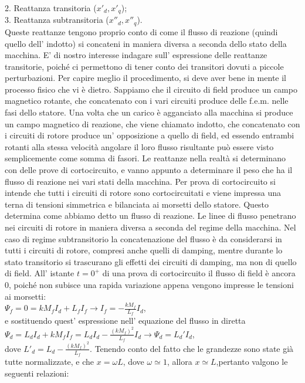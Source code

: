 \documentclass[Lau,noexaminfo]{sapthesis}
\begin{document}
	2. Reattanza transitoria ($x'_d, x'_q$);\\
	3. Reattanza subtransitoria ($x''_d,x''_q$).\\
	Queste reattanze tengono proprio conto di come il flusso di reazione (quindi quello dell' indotto) si concateni in maniera diversa a seconda dello stato della macchina. E' di nostro interesse indagare sull' espressione delle reattanze transitorie, poiché ci permettono di tener conto dei transitori dovuti a piccole perturbazioni.
	Per capire meglio il procedimento, si deve aver bene in mente il processo fisico che vi è dietro. Sappiamo che il circuito di field produce un campo magnetico rotante, che concatenato con i vari circuiti produce delle f.e.m. nelle fasi dello statore. Una volta che un carico è agganciato alla macchina si produce un campo magnetico di reazione, che viene chiamato indotto, che concatenato con i circuiti di rotore produce un' opposizione a quello di field, ed essendo entrambi rotanti alla stessa velocità angolare il loro flusso risultante può essere visto semplicemente come somma di fasori. Le reattanze nella realtà si determinano con delle prove di cortocircuito, e vanno appunto a determinare il peso che ha il flusso di reazione nei vari stati della macchina. Per prova di cortocircuito si intende che tutti i circuiti di rotore sono cortocircuitati e viene impressa una terna di tensioni simmetrica  e bilanciata ai morsetti dello statore. Questo determina come abbiamo detto un flusso di reazione. Le linee di flusso penetrano nei circuiti di rotore in maniera diversa a seconda del regime della macchina. Nel caso di regime subtransitorio la concatenazione del flusso è da considerarsi in tutti i circuiti di rotore, compresi anche quelli di damping, mentre durante lo stato transitorio si trascurano gli effetti dei circuiti di damping, ma non di quello di field. All' istante $t=0^+$ di una prova di cortocircuito il flusso di field è ancora 0, poiché non subisce una rapida variazione appena vengono impresse le tensioni ai morsetti:\\
	$\Psi_f=0=kM_fI_d+L_fI_f \rightarrow I_f=-\frac{kM_f}{L_f}I_d$,\\
	e sostituendo quest' espressione nell' equazione del flusso in diretta\\
	$\Psi_d=L_dI_d+kM_fI_f=L_dI_d-\frac{(kM_f)^2}{L_f}I_d \rightarrow \Psi_d=L_d'I_d$,\\
	dove $L'_d=L_d-\frac{(kM_f)^2}{L_f}$. Tenendo conto del fatto che le grandezze sono state già tutte normalizzate, e che $x=\omega L$, dove $\omega\simeq1$, allora $x\simeq L$,pertanto valgono le seguenti relazioni:\\
\end{document}
